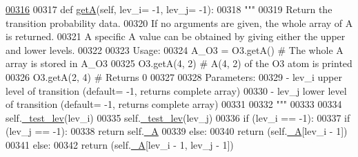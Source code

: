 \begin{DoxyCode}
\hypertarget{classpyneb_1_1utils_1_1pn__chianti_1_1___atom_chianti_l00316}{}\hyperlink{classpyneb_1_1utils_1_1pn__chianti_1_1___atom_chianti_aed967b738fd8c3d9ebef843f71d7063e}{00316} 
00317     \textcolor{keyword}{def }\hyperlink{classpyneb_1_1utils_1_1pn__chianti_1_1___atom_chianti_aed967b738fd8c3d9ebef843f71d7063e}{getA}(self, lev\_i= -1, lev\_j= -1):
00318         \textcolor{stringliteral}{"""}
00319 \textcolor{stringliteral}{        Return the transition probability data. }
00320 \textcolor{stringliteral}{        If no arguments are given, the whole array of A is returned.}
00321 \textcolor{stringliteral}{        A specific A value can be obtained by giving either the upper and lower levels.}
00322 \textcolor{stringliteral}{            }
00323 \textcolor{stringliteral}{        Usage:}
00324 \textcolor{stringliteral}{            A\_O3 = O3.getA()          # The whole A array is stored in A\_O3}
00325 \textcolor{stringliteral}{            O3.getA(4, 2)      # A(4, 2) of the O3 atom is printed}
00326 \textcolor{stringliteral}{            O3.getA(2, 4)      # Returns 0}
00327 \textcolor{stringliteral}{}
00328 \textcolor{stringliteral}{        Parameters:}
00329 \textcolor{stringliteral}{            - lev\_i  upper level of transition (default= -1, returns complete array)}
00330 \textcolor{stringliteral}{            - lev\_j  lower level of transition (default= -1, returns complete array)}
00331 \textcolor{stringliteral}{            }
00332 \textcolor{stringliteral}{        """}
00333         
00334         self.\hyperlink{classpyneb_1_1utils_1_1pn__chianti_1_1___atom_chianti_a596a6602f53c54689316ee543e407c49}{\_test\_lev}(lev\_i)
00335         self.\hyperlink{classpyneb_1_1utils_1_1pn__chianti_1_1___atom_chianti_a596a6602f53c54689316ee543e407c49}{\_test\_lev}(lev\_j)
00336         \textcolor{keywordflow}{if} (lev\_i == -1):
00337             \textcolor{keywordflow}{if} (lev\_j == -1):
00338                 \textcolor{keywordflow}{return} self.\hyperlink{classpyneb_1_1utils_1_1pn__chianti_1_1___atom_chianti_a4d531860236fc5a6564cc861b28cabe7}{\_A}
00339             \textcolor{keywordflow}{else}:
00340                 \textcolor{keywordflow}{return} (self.\hyperlink{classpyneb_1_1utils_1_1pn__chianti_1_1___atom_chianti_a4d531860236fc5a6564cc861b28cabe7}{\_A}[lev\_i - 1])
00341         \textcolor{keywordflow}{else}:
00342             \textcolor{keywordflow}{return} (self.\hyperlink{classpyneb_1_1utils_1_1pn__chianti_1_1___atom_chianti_a4d531860236fc5a6564cc861b28cabe7}{\_A}[lev\_i - 1, lev\_j - 1])

\end{DoxyCode}
